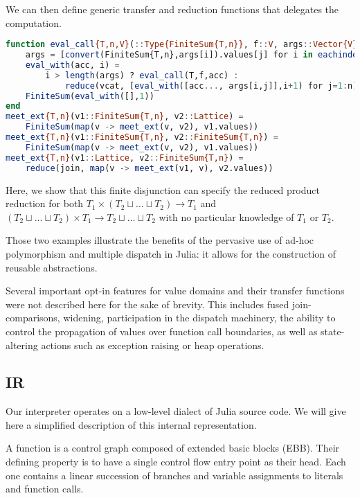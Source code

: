 \documentclass[11pt]{article}
\begin{document}
We can then define generic transfer and reduction functions that delegates the computation.

\begin{lstlisting}[language=julia]
function eval_call{T,n,V}(::Type{FiniteSum{T,n}}, f::V, args::Vector{V})
    args = [convert(FiniteSum{T,n},args[i]).values[j] for i in eachindex(args), j=1:n]
    eval_with(acc, i) =
        i > length(args) ? eval_call(T,f,acc) :
            reduce(vcat, [eval_with([acc..., args[i,j]],i+1) for j=1:n])
    FiniteSum(eval_with([],1))
end
meet_ext{T,n}(v1::FiniteSum{T,n}, v2::Lattice) =
    FiniteSum(map(v -> meet_ext(v, v2), v1.values))
meet_ext{T,n}(v1::FiniteSum{T,n}, v2::FiniteSum{T,n}) =
    FiniteSum(map(v -> meet_ext(v, v2), v1.values))
meet_ext{T,n}(v1::Lattice, v2::FiniteSum{T,n}) =
    reduce(join, map(v -> meet_ext(v1, v), v2.values))
\end{lstlisting}

Here, we show that this finite disjunction can specify the reduced product reduction for both $T_1\times\left(T_2\sqcup\dots\sqcup T_2\right)\to T_1$ and $\left(T_2\sqcup\dots\sqcup T_2\right)\times T_1 \to T_2\sqcup\dots\sqcup T_2$ with no particular knowledge of $T_1$ or $T_2$.

Those two examples illustrate the benefits of the pervasive use of ad-hoc polymorphism and multiple dispatch in Julia: it allows for the construction of reusable abstractions.

Several important opt-in features for value domains and their transfer functions were not described here for the sake of brevity. This includes fused join-comparisons, widening, participation in the dispatch machinery, the ability to control the propagation of values over function call boundaries, as well as state-altering actions such as exception raising or heap operations.


\subsection*{IR}

Our interpreter operates on a low-level dialect of Julia source code.
We will give here a simplified description of this internal representation.

A function is a control graph composed of extended basic blocks (EBB). Their defining property is to have a single control flow entry point as their head. Each one contains a linear succession of branches and variable assignments to literals and function calls.
\end{document}
